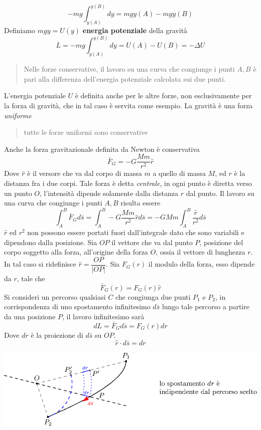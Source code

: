 \documentclass[10pt, letterpaper]{report}
\begin{document}
$$ -mg\int_{y(A)}^{y(B)}dy=mgy(A)-mgy(B)$$
Definiamo $mgy=U(y)$ \textbf{energia potenziale} della gravità
$$ L=-mg\int_{y(A)}^{y(B)}dy=U(A)-U(B)=-\Delta U$$
\begin{quote}
    Nelle forze conservative, il lavoro su una curva che congiunge i punti $A,B$ è pari alla differenza
     dell'energia potenziale calcolata sui due punti.
\end{quote}
L'energia potenziale $U$ è definita anche per le altre forze, non esclusivamente 
per la forza di gravità, che in tal caso è servita come esempio. La gravità 
è una forza \textit{uniforme}\begin{quote}
    tutte le forze uniformi sono conservative
\end{quote}
Anche la forza gravitazionale definita da Newton è conservativa 
$$ \bar F_G=-G\frac{Mm}{r^2}\hat r$$
Dove $\hat r$ è il versore che va dal corpo di massa $m$ a quello di massa $M$, ed $r$ è la distanza fra i due corpi. Tale 
forza è detta \textit{centrale}, in ogni punto è diretta verso un punto $O$, l'intensità dipende 
solamente dalla distanza $r$ dal punto. Il lavoro su una curva 
che congiunge i punti $A,B$ risulta essere 
$$ \int_A^B\bar F_Gd\bar s=\int_A^B-G\frac{Mm}{r^2}\hat rd\bar s=
-GMm\int_A^B\frac{\hat r}{r^2} d\bar s$$
$\hat r$ ed $r^2$ non possono essere portati fuori dall'integrale dato che sono variabili e dipendono dalla 
posizione. Sia $OP$ il vettore che va dal punto $P$, posizione del corpo soggetto alla forza, all'origine della forza $O$, ossia 
il vettore di lunghezza $r$. In tal caso si ridefinisce $\hat r = \dfrac{OP}{|OP|}$. \acc 
Sia $F_G(r)$ il modulo della forza, esso dipende da $r$, tale che 
$$ \bar F_G(r)=F_G(r)\hat r$$
Si consideri un percorso qualsiasi $C$ che congiunga due punti $P_1$ e $P_2$, in corrispondenza di uno 
spostamento infinitesimo $d\bar s$ lungo tale percorso a partire da una posizione $P$, 
il lavoro infinitesimo sarà 
$$ dL=\bar F_Gd\bar s = F_G(r)dr$$
Dove $dr$ è la proiezione di $d\bar s$ su $OP$. 
$$ \hat r \cdot d\bar s=dr$$ 
\begin{center}
    \includegraphics[width=1\textwidth]{images/forzaCentrale.eps}
\end{center}
\end{document}
